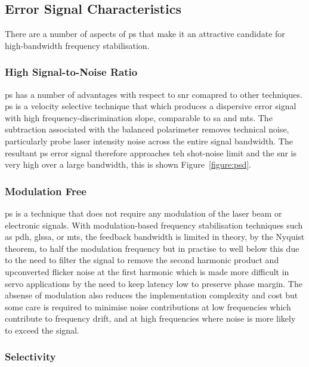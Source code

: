 \subsection{Error Signal Characteristics}

There are a number of aspects of \gls{ps} that make it an attractive candidate for high-bandwidth frequency stabilisation.

\subsubsection{High Signal-to-Noise Ratio}

\Gls{ps} has a number of advantages with respect to \gls{snr} comapred to other techniques.
\Gls{ps} is a velocity selective technique that which produces a dispersive error signal with high frequency-discrimination slope, comparable to \gls{sa} and \gls{mts}.
The subtraction associated with the balanced polarimeter removes technical noise, particularly probe laser intensity noise across the entire signal bandwidth.
The resultant \gls{ps} error signal therefore approaches teh shot-noise limit and the \gls{snr} is very high over a large bandwidth, this is shown Figure~\ref{figure:psd}.

\subsubsection{Modulation Free}

\Gls{ps} is a technique that does not require any modulation of the laser beam or electronic signals.
With modulation-based frequency stabilisation techniques such as \gls{pdh}, gls{sa}, or \gls{mts}, the feedback bandwidth is limited in theory, by the Nyquist theorem, to half the modulation frequency but in practise to well below this due to the need to filter the signal to remove the second harmonic product and upconverted flicker noise at the first harmonic which is made more difficult in servo applications by the need to keep latency low to preserve phase margin.
The absense of modulation also reduces the implementation complexity and cost but some care is required to minimise noise contributions at low frequencies which contribute to frequency drift, and at high frequencies where noise is more likely to exceed the signal.

\subsubsection{Selectivity}\label{section:capture_range}

